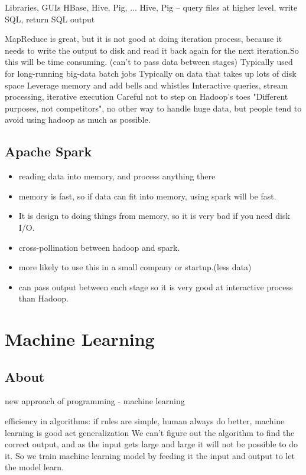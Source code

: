 \documentclass[fancy,11pt,titlestyle=display]{style/elegantbook}
\begin{document}
Libraries, GUIs
HBase, Hive, Pig, ...
Hive, Pig – query files at higher level, write SQL, return SQL output

MapReduce is great, but it is not good at doing iteration process, because it needs to write the 
output to disk and read it back again for the next iteration.So this will be time consuming. (can't to pass data between stages)
Typically used for long-running big-data batch jobs
Typically on data that takes up lots of disk space
Leverage memory and add bells and whistles
Interactive queries, stream processing, iterative execution
Careful not to step on Hadoop's toes
"Different purposes, not competitors", no other way to handle huge data, but people tend to avoid using 
hadoop as much as possible.

\section{Apache Spark}
\begin{itemize}
    \item reading data into memory, and process anything there
    \item memory is fast, so if data can fit into memory, using spark will be fast.
    \item It is design to doing things from memory, so it is very bad if you need disk I/O.
    \item cross-pollination between hadoop and spark.
    \item more likely to use this in a small company or startup.(less data)
    \item can pass output between each stage so it is very good at interactive process than Hadoop.
\end{itemize}{}


\chapter{Machine Learning}

\section{About}
new approach of programming - machine learning

efficiency in algorithms:
if rules are simple, human always do better, machine learning is good act generalization
We can't figure out the algorithm to find the correct output, and as the input gets large and large it will not be possible to do it. So we train machine learning model by feeding it the input and output to let the model learn.
\end{document}
